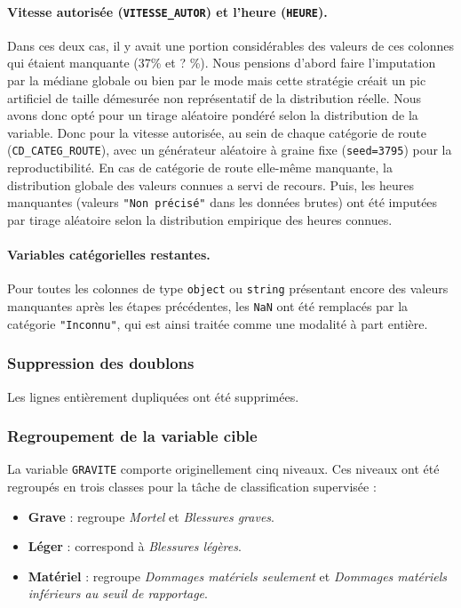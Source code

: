 \documentclass[12pt]{article}
\begin{document}
\paragraph{Vitesse autorisée (\texttt{VITESSE\_AUTOR}) et l'heure (\texttt{HEURE}).}
Dans ces deux cas, il y avait une portion considérables des valeurs de ces colonnes qui étaient manquante (37\% et ? \%). Nous pensions d'abord faire l'imputation par la médiane globale ou bien par le mode mais cette stratégie créait un pic artificiel de taille démesurée
non représentatif de la distribution réelle. Nous avons donc opté
pour un tirage aléatoire pondéré selon la distribution de la variable. Donc pour la vitesse autorisée, 
au sein de chaque catégorie de route (\texttt{CD\_CATEG\_ROUTE}),
avec un générateur aléatoire à graine fixe (\texttt{seed=3795}) pour
la reproductibilité. En cas de catégorie de route elle-même manquante,
la distribution globale des valeurs connues a servi de recours.
Puis, les heures manquantes (valeurs \texttt{"Non précisé"}
dans les données brutes) ont été imputées par tirage aléatoire selon la
distribution empirique des heures connues.
 
\paragraph{Variables catégorielles restantes.}
Pour toutes les colonnes de type \texttt{object} ou \texttt{string}
présentant encore des valeurs manquantes après les étapes précédentes,
les \texttt{NaN} ont été remplacés par la catégorie \texttt{"Inconnu"},
qui est ainsi traitée comme une modalité à part entière.
 
\subsubsection{Suppression des doublons}
 
Les lignes entièrement dupliquées ont été supprimées.
 
\subsubsection{Regroupement de la variable cible}
 
La variable \texttt{GRAVITE} comporte originellement cinq niveaux.
Ces niveaux ont été regroupés en trois classes pour la tâche de
classification supervisée :
 
\begin{itemize}
  \item \textbf{Grave} : regroupe \emph{Mortel} et
        \emph{Blessures graves}.
  \item \textbf{Léger} : correspond à \emph{Blessures légères}.
  \item \textbf{Matériel} : regroupe \emph{Dommages matériels seulement}
        et \emph{Dommages matériels inférieurs au seuil de rapportage}.
\end{itemize}
 
\end{document}
